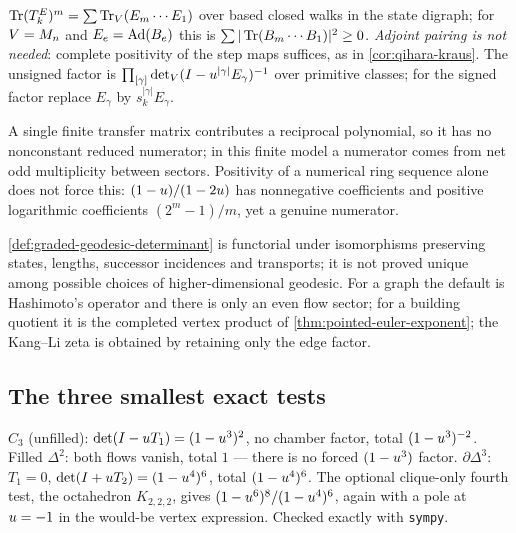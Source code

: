 \begin{theorem}
\label{thm:kraus-ring-positivity}
$\operatorname{Tr}(T^E_k)^m = \sum\operatorname{Tr}_V(E_m\cdots E_1)$ over based closed walks in the state
digraph; for $V = M_n$ and $E_e = \operatorname{Ad}(B_e)$ this is
$\sum|\operatorname{Tr}(B_m\cdots B_1)|^2\ge0$. \emph{Adjoint pairing is not needed}: complete
positivity of the step maps suffices, as in \cref{cor:qihara-kraus}. The
unsigned factor is
$\prod_{[\gamma]}\det_V(I-u^{|\gamma|}E_\gamma)^{-1}$ over primitive classes;
for the signed factor replace $E_\gamma$ by $s_k^{|\gamma|}E_\gamma$.
\end{theorem}

\begin{proposition}
\label{prop:positivity-no-go-scope}
A single finite transfer matrix contributes a reciprocal polynomial, so it has
no nonconstant reduced numerator; in this finite model a numerator comes from
net odd multiplicity between sectors. Positivity of a numerical ring sequence
alone does not force this: $(1-u)/(1-2u)$ has nonnegative coefficients and
positive logarithmic coefficients $(2^m-1)/m$, yet a genuine numerator.
\end{proposition}

\begin{observation}
\label{obs:graded-determinant-natural}
\cref{def:graded-geodesic-determinant} is functorial under isomorphisms
preserving states, lengths, successor incidences and transports; it is not
proved unique among possible choices of higher-dimensional geodesic. For a
graph the default is Hashimoto's operator and there is only an even flow sector;
for a building quotient it is the completed vertex product of
\cref{thm:pointed-euler-exponent}; the Kang--Li zeta is obtained by retaining
only the edge factor.
\end{observation}

\subsection{The three smallest exact tests}
\begin{numerical}
\label{num:small-complex-tests}
$C_3$ (unfilled): $\det(I-u T_1) = (1-u^3)^2$, no chamber factor, total
$(1-u^3)^{-2}$. Filled $\Delta^2$: both flows vanish, total $1$ --- there is %
no forced $(1-u^3)$ factor. $\partial\Delta^3$: $T_1 = 0$, %
$\det(I+u T_2) = (1-u^4)^6$, total $(1-u^4)^6$. The optional clique-only
fourth test, the octahedron $K_{2,2,2}$, gives
$(1-u^6)^8/(1-u^4)^6$, again with a pole at $u = -1$ in the would-be
vertex expression. Checked exactly with \texttt{sympy}.
\end{numerical}
